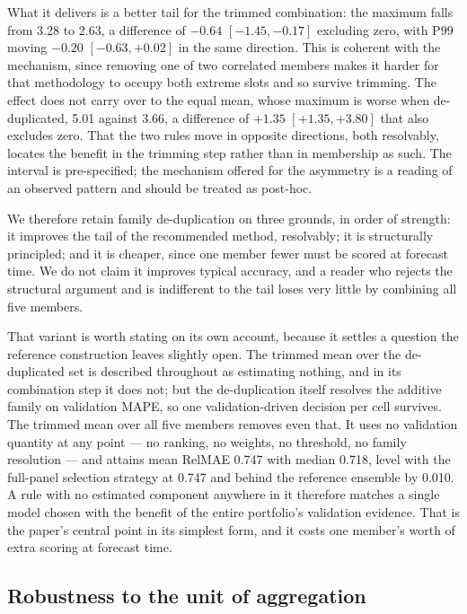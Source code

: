 \documentclass[11pt]{article}
\begin{document}
What it delivers is a better tail for the trimmed combination: the maximum falls from 3.28 to 2.63, a difference of $-0.64$ $[-1.45, -0.17]$ excluding zero, with P99 moving $-0.20$ $[-0.63, +0.02]$ in the same direction. This is coherent with the mechanism, since removing one of two correlated members makes it harder for that methodology to occupy both extreme slots and so survive trimming. The effect does not carry over to the equal mean, whose maximum is worse when de-duplicated, 5.01 against 3.66, a difference of $+1.35$ $[+1.35, +3.80]$ that also excludes zero. That the two rules move in opposite directions, both resolvably, locates the benefit in the trimming step rather than in membership as such. The interval is pre-specified; the mechanism offered for the asymmetry is a reading of an observed pattern and should be treated as post-hoc.

We therefore retain family de-duplication on three grounds, in order of strength: it improves the tail of the recommended method, resolvably; it is structurally principled; and it is cheaper, since one member fewer must be scored at forecast time. We do not claim it improves typical accuracy, and a reader who rejects the structural argument and is indifferent to the tail loses very little by combining all five members.

That variant is worth stating on its own account, because it settles a question the reference construction leaves slightly open. The trimmed mean over the de-duplicated set is described throughout as estimating nothing, and in its combination step it does not; but the de-duplication itself resolves the additive family on validation MAPE, so one validation-driven decision per cell survives. The trimmed mean over all five members removes even that. It uses no validation quantity at any point --- no ranking, no weights, no threshold, no family resolution --- and attains mean RelMAE 0.747 with median 0.718, level with the full-panel selection strategy at 0.747 and behind the reference ensemble by 0.010. A rule with no estimated component anywhere in it therefore matches a single model chosen with the benefit of the entire portfolio's validation evidence. That is the paper's central point in its simplest form, and it costs one member's worth of extra scoring at forecast time.

\subsection{Robustness to the unit of aggregation}
\label{sec:units}
\end{document}
